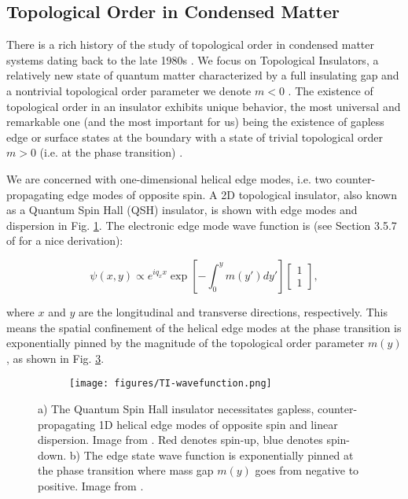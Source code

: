 \documentclass[onecolumn,
               superscriptaddress,
               floatfix,
               longbibliography, 
               showkeys,apl]{revtex4-2}
\begin{document}
\subsection{Topological Order in Condensed Matter}\label{sec:CondMat}

There is a rich history of the study of topological order in condensed matter systems dating back to the late 1980s \cite{Wen_2013}. We focus on Topological Insulators, a relatively new state of quantum matter characterized by a full insulating gap and a nontrivial topological order parameter we denote $m<0$ \cite{RevModPhys.83.1057}. The existence of topological order in an insulator exhibits unique behavior, the most universal and remarkable one (and the most important for us) being the existence of gapless edge or surface states at the boundary with a state of trivial topological order $m>0$ (i.e. at the phase transition) \cite{FRUCHART2013779}.

We are concerned with one-dimensional helical edge modes, i.e. two counter-propagating edge modes of opposite spin. A 2D topological insulator, also known as a Quantum Spin Hall (QSH) insulator, is shown with edge modes and dispersion in Fig. \ref{subfig:QSH}. The electronic edge mode wave function is (see Section 3.5.7 of \cite{FRUCHART2013779} for a nice derivation):

\begin{equation}
    \psi (x,y) \propto e^{iq_xx} \exp \left[-\int_{0}^{y} m(y') dy'\right] \begin{bmatrix}1 \\ 1\end{bmatrix},
\label{eq:tiwavefunction}
\end{equation}

where $x$ and $y$ are the longitudinal and transverse directions, respectively. This means the spatial confinement of the helical edge modes at the phase transition is exponentially pinned by the magnitude of the topological order parameter $m(y)$, as shown in Fig. \ref{subfig:TI-wavefunction}.

\begin{figure}[H]
\begin{subfigure}{.5\textwidth}
    \centering
    \caption{}    
    \label{subfig:QSH}
\end{subfigure}
\begin{subfigure}{.5\textwidth}
    \centering
    \texttt{[image: figures/TI-wavefunction.png]}
    \caption{}
    \label{subfig:TI-wavefunction}
\end{subfigure}
\caption{a) The Quantum Spin Hall insulator necessitates gapless, counter-propagating 1D helical edge modes of opposite spin and linear dispersion. Image from \cite{RevModPhys.83.1057}. Red denotes spin-up, blue denotes spin-down. b) The edge state wave function is exponentially pinned at the phase transition where mass gap $m(y)$ goes from negative to positive. Image from \cite{FRUCHART2013779}.}
\end{figure}
\end{document}
